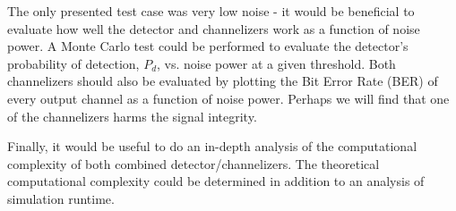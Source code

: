 \documentclass[12pt]{report}
\begin{document}
The only presented test case was very low noise - it would be beneficial to
evaluate how well the detector and channelizers work as a function of noise
power. A Monte Carlo test could be performed to evaluate the detector's
probability of detection, $P_d$, vs. noise power at a given threshold. Both
channelizers should also be evaluated by plotting the Bit Error Rate (BER) of
every output channel as a function of noise power. Perhaps we will find that
one of the channelizers harms the signal integrity.

Finally, it would be useful to do an in-depth analysis of the computational
complexity of both combined detector/channelizers. The theoretical
computational complexity could be determined in addition to an analysis of
simulation runtime.


%
%

%



\nocite{*}


%

\end{document}
